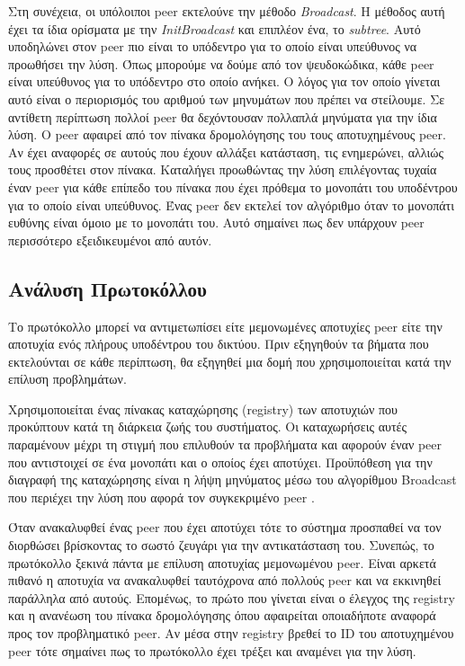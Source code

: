 Στη συνέχεια, οι υπόλοιποι peer εκτελούνε την μέθοδο \textit{Broadcast}. 
Η μέθοδος αυτή έχει τα ίδια ορίσματα με την \textit{InitBroadcast} και 
επιπλέον ένα, το \textit{subtree}. Αυτό υποδηλώνει στον peer πιο είναι το 
υπόδεντρο για το οποίο είναι υπεύθυνος να προωθήσει την λύση. Όπως μπορούμε 
να δούμε από τον ψευδοκώδικα, κάθε peer είναι υπεύθυνος για το υπόδεντρο στο 
οποίο ανήκει. Ο λόγος για τον οποίο γίνεται αυτό είναι ο περιορισμός του 
αριθμού των μηνυμάτων που πρέπει να στείλουμε. Σε αντίθετη περίπτωση πολλοί 
peer θα δεχόντουσαν πολλαπλά μηνύματα για την ίδια λύση. Ο peer αφαιρεί από 
τον πίνακα δρομολόγησης του τους αποτυχημένους peer. Αν έχει αναφορές σε 
αυτούς που έχουν αλλάξει κατάσταση, τις ενημερώνει, αλλιώς 
τους προσθέτει στον πίνακα. Καταλήγει προωθώντας την λύση επιλέγοντας τυχαία 
έναν peer για κάθε επίπεδο του πίνακα που έχει πρόθεμα το μονοπάτι του 
υποδέντρου για το οποίο είναι υπεύθυνος. Ένας peer δεν εκτελεί τον αλγόριθμο 
όταν το μονοπάτι ευθύνης είναι όμοιο με το μονοπάτι του. Αυτό σημαίνει πως 
δεν υπάρχουν peer περισσότερο εξειδικευμένοι από αυτόν.

\subsection{Ανάλυση Πρωτοκόλλου}

Το πρωτόκολλο μπορεί να αντιμετωπίσει είτε μεμονωμένες αποτυχίες peer είτε 
την αποτυχία ενός πλήρους υποδέντρου του δικτύου. Πριν εξηγηθούν τα βήματα 
που εκτελούνται σε κάθε περίπτωση, θα εξηγηθεί μια δομή που χρησιμοποιείται 
κατά την επίλυση προβλημάτων.

Χρησιμοποιείται ένας πίνακας καταχώρησης (registry) των αποτυχιών που 
προκύπτουν κατά τη διάρκεια ζωής του συστήματος. Οι καταχωρήσεις αυτές 
παραμένουν μέχρι τη στιγμή που επιλυθούν τα προβλήματα και αφορούν 
έναν peer που αντιστοιχεί σε ένα μονοπάτι και ο οποίος έχει αποτύχει. 
Προϋπόθεση για την διαγραφή της καταχώρησης είναι η λήψη μηνύματος μέσω του 
αλγορίθμου Broadcast που περιέχει την λύση που αφορά τον συγκεκριμένο peer .

Όταν ανακαλυφθεί ένας peer που έχει αποτύχει τότε το σύστημα προσπαθεί να 
τον διορθώσει βρίσκοντας το σωστό ζευγάρι για την αντικατάσταση του. Συνεπώς, 
το πρωτόκολλο ξεκινά πάντα με επίλυση αποτυχίας μεμονωμένου peer. Είναι αρκετά 
πιθανό η αποτυχία να ανακαλυφθεί ταυτόχρονα από πολλούς peer και να εκκινηθεί 
παράλληλα από αυτούς. Επομένως, το πρώτο που γίνεται είναι ο έλεγχος της registry και 
η ανανέωση του πίνακα δρομολόγησης όπου αφαιρείται οποιαδήποτε αναφορά προς 
τον προβληματικό peer. Αν μέσα στην registry βρεθεί το ID του αποτυχημένου peer 
τότε σημαίνει πως το πρωτόκολλο έχει τρέξει και αναμένει για την λύση.

